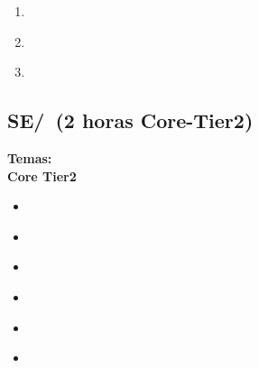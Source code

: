 \begin{enumerate}
	\item \SESoftwareProjectManagementLOApplyTheOf\xspace[\SESoftwareProjectManagementLOApplyTheOfLevel]\label{sec:BOK:SESoftwareProjectManagementLOApplyTheOf}
	\item \SESoftwareProjectManagementLOConductAAnalysis\xspace[\SESoftwareProjectManagementLOConductAAnalysisLevel]\label{sec:BOK:SESoftwareProjectManagementLOConductAAnalysis}
	\item \SESoftwareProjectManagementLOIdentifyAndOfFor\xspace[\SESoftwareProjectManagementLOIdentifyAndOfForLevel]\label{sec:BOK:SESoftwareProjectManagementLOIdentifyAndOfFor}
\end{enumerate}


\subsection{SE/\SEToolsandEnvironments~(2 horas Core-Tier2)}\label{sec:BOK:SEToolsandEnvironments}
\noindent \textbf{Temas:}\\
\noindent \textbf{Core Tier2}
\begin{itemize}
	\item \SEToolsandEnvironmentsTopicSoftware\label{sec:BOK:SEToolsandEnvironmentsTopicSoftware}
	\item \SEToolsandEnvironmentsTopicRelease\label{sec:BOK:SEToolsandEnvironmentsTopicRelease}
	\item \SEToolsandEnvironmentsTopicRequierements\label{sec:BOK:SEToolsandEnvironmentsTopicRequierements}
	\item \SEToolsandEnvironmentsTopicTesting\label{sec:BOK:SEToolsandEnvironmentsTopicTesting}
	\item \SEToolsandEnvironmentsTopicProgramming\label{sec:BOK:SEToolsandEnvironmentsTopicProgramming}
	\item \SEToolsandEnvironmentsTopicTool\label{sec:BOK:SEToolsandEnvironmentsTopicTool}
\end{itemize}


